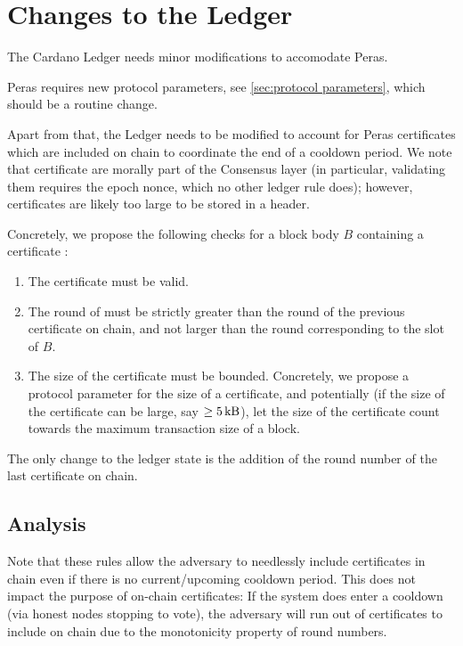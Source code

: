\section{Changes to the Ledger}

The Cardano Ledger \parencite{shelley-ledger-specs,cardano-formal-ledger-specs} needs minor modifications to accomodate Peras.

Peras requires new protocol parameters, see \cref{sec:protocol parameters}, which should be a routine change.

Apart from that, the Ledger needs to be modified to account for Peras certificates which are included on chain to coordinate the end of a cooldown period.
We note that certificate are morally part of the Consensus layer (in particular, validating them requires the epoch nonce, which no other ledger rule does); however, certificates are likely too large to be stored in a header.

Concretely, we propose the following checks for a block body $B$ containing a certificate \cert{}:
\begin{enumerate}
\item
  The certificate \cert{} must be valid.
\item
  The round of \cert{} must be strictly greater than the round of the previous certificate on chain, and not larger than the round corresponding to the slot of $B$.
\item
  The size of the certificate must be bounded.
  Concretely, we propose a protocol parameter \perasCertSizeLimit{} for the size of a certificate, and potentially (if the size of the certificate can be large, say $\ge\SI{5}{\kilo\byte}$), let the size of the certificate count towards the maximum transaction size of a block.
\end{enumerate}
The only change to the ledger state is the addition of the round number of the last certificate on chain.

\subsection{Analysis}
Note that these rules allow the adversary to needlessly include certificates in chain even if there is no current/upcoming cooldown period.
This does not impact the purpose of on-chain certificates:
If the system does enter a cooldown (via honest nodes stopping to vote), the adversary will run out of certificates to include on chain due to the monotonicity property of round numbers.

